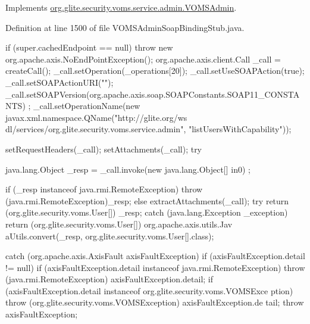 Implements \hyperlink{interfaceorg_1_1glite_1_1security_1_1voms_1_1service_1_1admin_1_1VOMSAdmin_a2c0f19e37d956785695fded8196b3571}{org.glite.security.voms.service.admin.VOMSAdmin}.



Definition at line 1500 of file VOMSAdminSoapBindingStub.java.


\begin{DoxyCode}
                                                                                 
                                                                                    {
        if (super.cachedEndpoint == null) {
            throw new org.apache.axis.NoEndPointException();
        }
        org.apache.axis.client.Call _call = createCall();
        _call.setOperation(_operations[20]);
        _call.setUseSOAPAction(true);
        _call.setSOAPActionURI("");
        _call.setSOAPVersion(org.apache.axis.soap.SOAPConstants.SOAP11_CONSTANTS)
      ;
        _call.setOperationName(new javax.xml.namespace.QName("http://glite.org/ws
      dl/services/org.glite.security.voms.service.admin", "listUsersWithCapability"));

        setRequestHeaders(_call);
        setAttachments(_call);
 try {        java.lang.Object _resp = _call.invoke(new java.lang.Object[] {in0})
      ;

        if (_resp instanceof java.rmi.RemoteException) {
            throw (java.rmi.RemoteException)_resp;
        }
        else {
            extractAttachments(_call);
            try {
                return (org.glite.security.voms.User[]) _resp;
            } catch (java.lang.Exception _exception) {
                return (org.glite.security.voms.User[]) org.apache.axis.utils.Jav
      aUtils.convert(_resp, org.glite.security.voms.User[].class);
            }
        }
  } catch (org.apache.axis.AxisFault axisFaultException) {
    if (axisFaultException.detail != null) {
        if (axisFaultException.detail instanceof java.rmi.RemoteException) {
              throw (java.rmi.RemoteException) axisFaultException.detail;
         }
        if (axisFaultException.detail instanceof org.glite.security.voms.VOMSExce
      ption) {
              throw (org.glite.security.voms.VOMSException) axisFaultException.de
      tail;
         }
   }
  throw axisFaultException;
}
    }
\end{DoxyCode}
